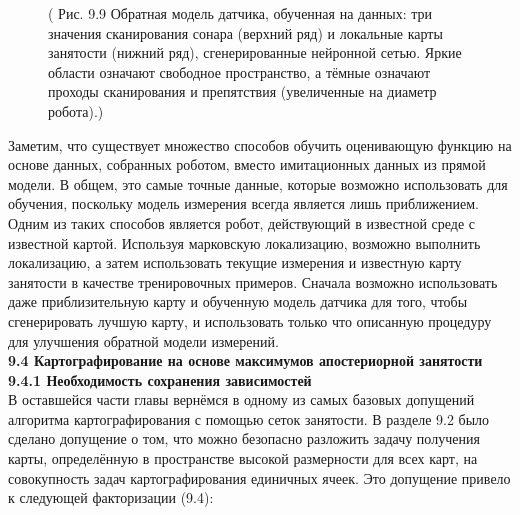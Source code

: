 \documentclass[10pt,a4paper]{article}
\begin{document}
\begin{figure}[H]
	\caption{ ( Рис. 9.9 Обратная модель датчика, обученная на данных: три значения сканирования сонара (верхний ряд) и локальные карты занятости (нижний ряд), сгенерированные нейронной сетью. Яркие области означают свободное пространство, а тёмные означают проходы сканирования и препятствия (увеличенные на диаметр робота).)}
	\label{fig:99orig}
\end{figure}

Заметим, что существует множество способов обучить оценивающую функцию на основе данных, собранных роботом, вместо имитационных данных из прямой модели. В общем, это самые точные данные, которые возможно использовать для обучения, поскольку модель измерения всегда является лишь приближением. Одним из таких способов является робот, действующий в известной среде с известной картой. Используя марковскую локализацию, возможно выполнить локализацию, а затем использовать текущие измерения и известную карту занятости в качестве тренировочных примеров.  Сначала возможно использовать даже приблизительную карту и обученную модель датчика для того, чтобы сгенерировать лучшую карту, и использовать только что описанную процедуру для улучшения обратной модели измерений.\\

\textbf{9.4	Картографирование на основе максимумов апостериорной занятости }\\

\textbf{9.4.1	Необходимость сохранения зависимостей}\\

В оставшейся части главы вернёмся в одному из самых базовых допущений алгоритма картографирования с помощью сеток занятости. В разделе 9.2 было сделано допущение о том, что можно безопасно  разложить задачу получения карты, определённую в пространстве высокой размерности для всех карт, на совокупность задач картографирования единичных ячеек. Это допущение привело к следующей факторизации (9.4):\\
\end{document}
